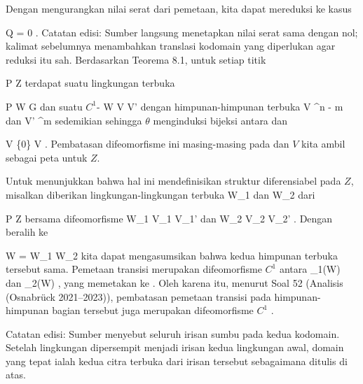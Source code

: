 {

Dengan mengurangkan nilai serat dari pemetaan, kita dapat mereduksi ke kasus

\mavergleichskette
{\vergleichskette
{ Q
}
{ = }{ 0
}
{  }{
}
{    }{
}
{   }{
}
}
{}{}{}
.
Catatan edisi: Sumber langsung menetapkan nilai serat sama dengan nol; kalimat sebelumnya menambahkan translasi kodomain yang diperlukan agar reduksi itu sah.
Berdasarkan
Teorema 8.1,
untuk setiap titik

\mavergleichskette
{\vergleichskette
{ P
}
{ \in }{ Z
}
{  }{
}
{    }{
}
{   }{
}
}
{}{}{}
terdapat suatu lingkungan terbuka

\mavergleichskette
{\vergleichskette
{ P
}
{ \in }{ W
}
{ \subseteq }{ G
}
{    }{
}
{   }{
}
}
{}{}{}
dan suatu
$C^1$-
\maabbdisp {\theta} { W } { V \times V'
} {}
dengan himpunan-himpunan terbuka
\mathkor {} {V \subseteq \R^{n - m }} {dan} {V' \subseteq \R^m} {}
sedemikian sehingga $\theta$ menginduksi bijeksi antara
 dan

\mavergleichskette
{\vergleichskette
{ V \times \{0\}
}
{ \cong }{ V
}
{  }{
}
{    }{
}
{   }{
}
}
{}{}{}
.
Pembatasan difeomorfisme ini masing-masing pada
 dan $V$ kita ambil sebagai peta untuk $Z$.
\teilbeweis {}{}{}
{Untuk menunjukkan bahwa hal ini mendefinisikan struktur diferensiabel pada $Z$, misalkan diberikan lingkungan-lingkungan terbuka
 {} {}
\mathkor {} {W_1} {dan} {W_2} {}
dari

\mavergleichskette
{\vergleichskette
{ P
}
{ \in }{ Z
}
{  }{
}
{    }{
}
{   }{
}
}
{}{}{}
bersama difeomorfisme
 {W_1 } { V_1 \times V_1'
} {} dan  {W_2 } { V_2 \times V_2'
} {.}
Dengan beralih ke

\mavergleichskette
{\vergleichskette
{ W
}
{ = }{ W_1 \cap W_2
}
{  }{
}
{    }{
}
{   }{
}
}
{}{}{}
kita dapat mengasumsikan bahwa kedua himpunan terbuka tersebut sama. Pemetaan transisi
 merupakan difeomorfisme $C^1$ antara
 {} {}
\mathkor {} {\theta_1(W)} {dan} {\theta_2(W)} {,}
yang memetakan
 ke
. Oleh karena itu, menurut
Soal 52 (Analisis (Osnabrück 2021--2023)),
pembatasan pemetaan transisi pada himpunan-himpunan bagian tersebut juga merupakan difeomorfisme $C^1$
 {} {.}}
{}

Catatan edisi: Sumber menyebut seluruh irisan sumbu pada kedua kodomain. Setelah lingkungan dipersempit menjadi irisan kedua lingkungan awal, domain yang tepat ialah kedua citra terbuka dari irisan tersebut sebagaimana ditulis di atas.

}

